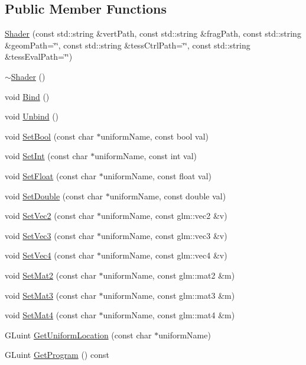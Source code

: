 \subsection*{Public Member Functions}
\begin{DoxyCompactItemize}
\item 
\mbox{\hyperlink{classngl_1_1_shader_a8fe213cc5bf88e3959fd0334c384b9ab}{Shader}} (const std\+::string \&vert\+Path, const std\+::string \&frag\+Path, const std\+::string \&geom\+Path=\char`\"{}\char`\"{}, const std\+::string \&tess\+Ctrl\+Path=\char`\"{}\char`\"{}, const std\+::string \&tess\+Eval\+Path=\char`\"{}\char`\"{})
\item 
\mbox{\hyperlink{classngl_1_1_shader_aff01df87e8a102f270b5b135a295e59d}{$\sim$\+Shader}} ()
\item 
void \mbox{\hyperlink{classngl_1_1_shader_a8b5c8c4788d011a65d158ef8428d1ece}{Bind}} ()
\item 
void \mbox{\hyperlink{classngl_1_1_shader_a70f8359738b84645ad00187f67b76ed7}{Unbind}} ()
\item 
void \mbox{\hyperlink{classngl_1_1_shader_a17264a5e88238815deea88062b9af83d}{Set\+Bool}} (const char $\ast$uniform\+Name, const bool val)
\item 
void \mbox{\hyperlink{classngl_1_1_shader_a728780194456067f3df1fa453ad4651d}{Set\+Int}} (const char $\ast$uniform\+Name, const int val)
\item 
void \mbox{\hyperlink{classngl_1_1_shader_a407853fd321a73721623218d4e814368}{Set\+Float}} (const char $\ast$uniform\+Name, const float val)
\item 
void \mbox{\hyperlink{classngl_1_1_shader_a79541dcabb46e09ea0ba23e527aae791}{Set\+Double}} (const char $\ast$uniform\+Name, const double val)
\item 
void \mbox{\hyperlink{classngl_1_1_shader_ac1655947f926eb8e0e747c769ae90844}{Set\+Vec2}} (const char $\ast$uniform\+Name, const glm\+::vec2 \&v)
\item 
void \mbox{\hyperlink{classngl_1_1_shader_adff0ef55d2e5794944f64aa5394ff3d2}{Set\+Vec3}} (const char $\ast$uniform\+Name, const glm\+::vec3 \&v)
\item 
void \mbox{\hyperlink{classngl_1_1_shader_a92eec76ca33087f5e28d8ebc210f82a4}{Set\+Vec4}} (const char $\ast$uniform\+Name, const glm\+::vec4 \&v)
\item 
void \mbox{\hyperlink{classngl_1_1_shader_a8105fef362a22233e46f77f59c7bb701}{Set\+Mat2}} (const char $\ast$uniform\+Name, const glm\+::mat2 \&m)
\item 
void \mbox{\hyperlink{classngl_1_1_shader_aa13fb95be36a83e444757388d54dfcf4}{Set\+Mat3}} (const char $\ast$uniform\+Name, const glm\+::mat3 \&m)
\item 
void \mbox{\hyperlink{classngl_1_1_shader_ab3c107f382db01c40318aa57f0ae1e9f}{Set\+Mat4}} (const char $\ast$uniform\+Name, const glm\+::mat4 \&m)
\item 
G\+Luint \mbox{\hyperlink{classngl_1_1_shader_ab64b54fa47834a799e2fe9bb51f488ed}{Get\+Uniform\+Location}} (const char $\ast$uniform\+Name)
\item 
G\+Luint \mbox{\hyperlink{classngl_1_1_shader_a705fa8fbd14d37c36a929c9befa69de0}{Get\+Program}} () const
\end{DoxyCompactItemize}


